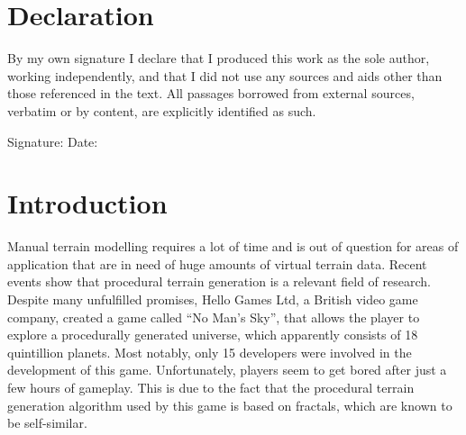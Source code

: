 \documentclass[11pt,a4paper,twoside,openright]{report}
\begin{document}

\tableofcontents
\listoffigures
\listoftables


\chapter*{Declaration}
By my own signature I declare that I produced this work as the sole author, working independently,
and that I did not use any sources and aids other than those referenced in the text.
All passages borrowed from external sources, verbatim or by content, are explicitly identified as
such.\\

\vspace{15mm}

\noindent Signature: \underline{\hspace{5cm}} \hspace{1cm}  Date: \underline{\hspace{5cm}}


\chapter{Introduction}
\label{sec:intro}

\pagestyle{fancy}

Manual terrain modelling requires a lot of time and is out of question for areas of application that are in need of huge amounts of virtual terrain data. Recent events show that procedural terrain generation is a relevant field of research. Despite many unfulfilled promises, Hello Games Ltd, a British video game company, created a game called ``No Man's Sky'', that allows the player to explore a procedurally generated universe, which apparently consists of 18 quintillion planets. Most notably, only 15 developers were involved in the development of this game. Unfortunately, players seem to get bored after just a few hours of gameplay. This is due to the fact that the procedural terrain generation algorithm used by this game is based on fractals, which are known to be self-similar.
\end{document}
